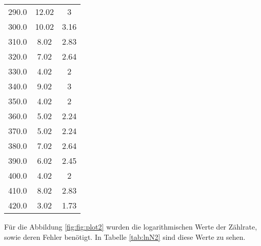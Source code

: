 \begin{table}
\begin{tabular}{c c c}
  290.0 & 12.02 & 3  \\
  300.0 & 10.02 & 3.16  \\
  310.0 & 8.02 & 2.83  \\
  320.0 & 7.02 & 2.64  \\
  330.0 & 4.02 & 2  \\
  340.0 & 9.02 & 3  \\
  350.0 & 4.02 & 2  \\
  360.0 & 5.02 & 2.24  \\
  370.0 & 5.02 & 2.24  \\
  380.0 & 7.02 & 2.64  \\
  390.0 & 6.02 & 2.45  \\
  400.0 & 4.02 & 2  \\
  410.0 & 8.02 & 2.83  \\
  420.0 & 3.02 & 1.73  \\
  \bottomrule
\end{tabular}
\end{table}
\FloatBarrier

Für die Abbildung \ref{fig:fig:plot2} wurden die logarithmischen Werte der Zählrate, sowie deren Fehler benötigt.
In Tabelle \ref{tab:lnN2} sind diese Werte zu sehen.

